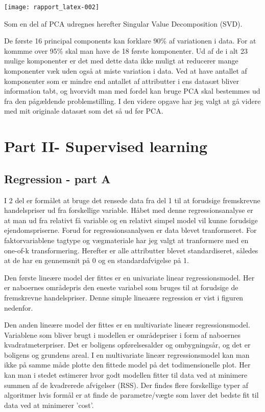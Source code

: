 \documentclass{report}
\begin{document}
\texttt{[image: rapport\_latex-002]}

Som en del af PCA udregnes herefter Singular Value Decomposition (SVD).

De første 16 principal components kan forklare 90\% af variationen i data. For at kommme over 95\% skal man have de 18 første komponenter. Ud af de i alt 23 mulige komponenter er det med dette data ikke muligt at reducerer mange komponenter væk uden også at miste variation i data. 
Ved at have antallet af komponenter som er mindre end antallet af attributter i ens datasæt bliver information tabt, og hvorvidt man med fordel kan bruge PCA skal bestemmes ud fra den pågældende problemstilling. I den videre opgave har jeg valgt at gå videre med mit originale datasæt som det så ud før PCA. 

\chapter{Part II- Supervised learning}

\section{Regression - part A}
I 2 del er formålet at bruge det rensede data fra del 1 til at forudsige fremskrevne handelspriser ud fra forskellige variable. 
Håbet med denne regressionsanalyse er at man ud fra relativt få variable og en relativt simpel model vil kunne forudsige ejendomspriserne. 
Forud for regressionsanalysen er data blevet tranformeret. For faktorvariablene tagtype og vægmateriale har jeg valgt at tranformere med en one-of-k transformering. Herefter er alle attributter blevet standardiseret, således at de har en gennemsnit på 0 og en standardafvigelse på 1. 

Den første lineære model der fittes er en univariate linear regressionsmodel. Her er naboernes områdepris den eneste variabel som bruges til at forudsige de fremskrevne handelspriser. 
Denne simple lineaære regression er vist i figuren nedenfor. 


Den anden lineære model der fittes er en multivariate lineær regressionsmodel. 
Variablene som bliver brugt i modellen er områdepriser i form af naboernes kvadratmeterpriser. Det er boligens opførelsesalder og ombygningsår, og det er boligens og grundens areal. 
I en multivariate lineær regressionsmodel kan man ikke på samme måde plotte den fittede model på det todimensionelle plot. Her kan man i stedet estimerer hvor godt modellen fitter til data ved at minimere summen af de kvadrerede afvigelser (RSS). 
Der findes flere forskellige typer af algoritmer hvis formål er at finde de parametre/vægte som laver det bedste fit til data ved at minimerer 'cost'. 
\end{document}
